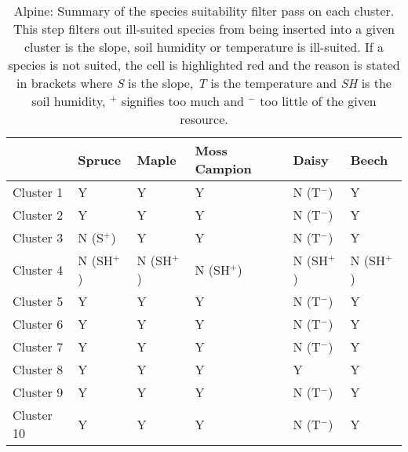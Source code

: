 \begin{table}[htb!]
  \centering
	    \begin{tabular}{|p{2cm}|p{2.5cm}|p{2.5cm}|p{2.5cm}|p{2.5cm}|p{2.5cm}|}
		\hline	
		&  \textbf{Spruce} & \textbf{Maple} & \textbf{Moss Campion} & \textbf{Daisy} & \textbf{Beech}\\
		\hline	
		Cluster 1 & 
		Y & 
		Y & 
		Y & 
		\cellcolor{color_red}N (T$^{-}$) & 
		Y \\
		\hline	
		Cluster 2 & 
		Y & 
		Y & 
		Y & 
		\cellcolor{color_red}N (T$^{-}$) & 
		Y \\
		\hline	
		Cluster 3 & 
		\cellcolor{color_red}N (S$^{+}$) & 
		Y & 
		Y & 
		\cellcolor{color_red}N (T$^{-}$) & 
		Y \\
		\hline	
		Cluster 4 & 
		\cellcolor{color_red}N (SH$^{+}$) & 
		\cellcolor{color_red}N (SH$^{+}$) & 
		\cellcolor{color_red}N (SH$^{+}$) & 
		\cellcolor{color_red}N (SH$^{+}$) & 
		\cellcolor{color_red}N (SH$^{+}$) \\
		\hline	
		Cluster 5 & 
		Y & 
		Y & 
		Y & 
		\cellcolor{color_red}N (T$^{-}$) & 
		Y \\
		\hline	
		Cluster 6 & 
		Y & 
		Y & 
		Y & 
		\cellcolor{color_red}N (T$^{-}$) & 
		Y \\
		\hline	
		Cluster 7 & 
		Y & 
		Y & 
		Y & 
		\cellcolor{color_red}N (T$^{-}$) & 
		Y \\
		\hline	
		Cluster 8 & 
		Y & 
		Y & 
		Y & 
		Y &
		Y \\
		\hline	
		Cluster 9 & 
		Y & 
		Y & 
		Y & 
		\cellcolor{color_red}N (T$^{-}$) & 
		Y \\
		\hline	
		Cluster 10 &
		Y & 
		Y & 
		Y & 
		\cellcolor{color_red}N (T$^{-}$) & 
		Y \\
		\hline	
		\end{tabular}
		\caption{Alpine: Summary of the species suitability filter pass on each cluster. This step filters out ill-suited species from being inserted into a given cluster is the slope, soil humidity or temperature is ill-suited. If a species is not suited, the cell is highlighted red and the reason is stated in brackets where \textit{S} is the slope, \textit{T} is the temperature and \textit{SH} is the soil humidity, $^{+}$ signifies too much and $^{-}$ too little of the given resource.}
	  \label{tab:results_alpine_species_suitability}
\end{table}

